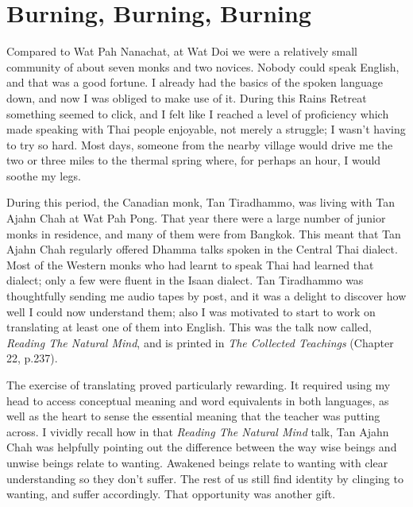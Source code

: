 \chapter{Burning, Burning, Burning}

Compared to Wat Pah Nanachat, at Wat Doi we were a relatively small
community of about seven monks and two novices. Nobody could speak
English, and that was a good fortune. I already had the basics of the
spoken language down, and now I was obliged to make use of it. During
this Rains Retreat something seemed to click, and I felt like I reached
a level of proficiency which made speaking with Thai people enjoyable,
not merely a struggle; I wasn't having to try so hard. Most days,
someone from the nearby village would drive me the two or three miles to
the thermal spring where, for perhaps an hour, I would soothe my legs.

During this period, the Canadian monk, Tan Tiradhammo, was living with
Tan Ajahn Chah at Wat Pah Pong. That year there were a large number of
junior monks in residence, and many of them were from Bangkok. This
meant that Tan Ajahn Chah regularly offered Dhamma talks spoken in the
Central Thai dialect. Most of the Western monks who had learnt to speak
Thai had learned that dialect; only a few were fluent in the Isaan
dialect. Tan Tiradhammo was thoughtfully sending me audio tapes by post,
and it was a delight to discover how well I could now understand them;
also I was motivated to start to work on translating at least one of
them into English. This was the talk now called,
\emph{Reading The Natural Mind}, and is printed in
\emph{The Collected Teachings}\cite{collected} (Chapter 22, p.237).

\enlargethispage{\baselineskip}


The exercise of translating proved particularly rewarding. It required
using my head to access conceptual meaning and word equivalents in both
languages, as well as the heart to sense the essential meaning that the
teacher was putting across. I vividly recall how in that \emph{Reading
The Natural Mind} talk, Tan Ajahn Chah was helpfully pointing out the
difference between the way wise beings and unwise beings relate to
wanting. Awakened beings relate to wanting with clear understanding so
they don't suffer. The rest of us still find identity by clinging to
wanting, and suffer accordingly. That opportunity was another gift.

